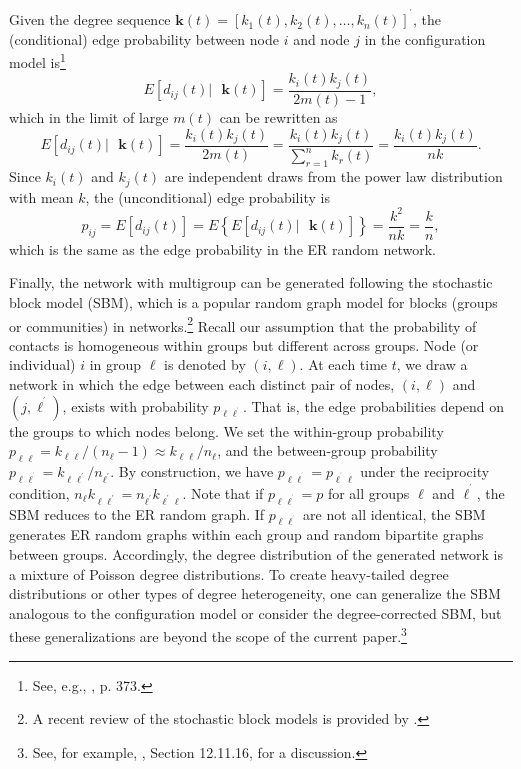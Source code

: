 \documentclass[12pt]{article}
\begin{document}
Given the degree sequence $\boldsymbol{k}\left(  t\right)  =\left[
k_{1}\left(  t\right)  ,k_{2}\left(  t\right)  ,\ldots,k_{n}\left(  t\right)
\right]  ^{^{\prime}}$, the (conditional) edge probability between node $i$
and node $j$ in the configuration model is\footnote{See, e.g.,
\cite{Newman2018book}, p. 373.}
\[
E\left[  d_{ij}\left(  t\right)  |\text{ }\boldsymbol{k}\left(  t\right)
\right]  =\frac{k_{i}\left(  t\right)  k_{j}\left(  t\right)  }{2m\left(
t\right)  -1},
\]
which in the limit of large $m\left(  t\right)  $ can be rewritten as%
\[
E\left[  d_{ij}\left(  t\right)  |\text{ }\boldsymbol{k}\left(  t\right)
\right]  =\frac{k_{i}\left(  t\right)  k_{j}\left(  t\right)  }{2m\left(
t\right)  }=\frac{k_{i}\left(  t\right)  k_{j}\left(  t\right)  }{\sum
_{r=1}^{n}k_{r}\left(  t\right)  }=\frac{k_{i}\left(  t\right)  k_{j}\left(
t\right)  }{nk}.
\]
Since $k_{i}\left(  t\right)  $ and $k_{j}\left(  t\right)  $ are independent
draws from the power law distribution with mean $k$, the (unconditional) edge
probability is%
\[
p_{ij}=E\left[  d_{ij}\left(  t\right)  \right]  =E\left\{  E\left[
d_{ij}\left(  t\right)  |\text{ }\boldsymbol{k}\left(  t\right)  \right]
\right\}  =\frac{k^{2}}{nk}=\frac{k}{n},
\]
which is the same as the edge probability in the ER random network.

Finally, the network with multigroup can be generated following the stochastic
block model (SBM), which is a popular random graph model for blocks (groups or
communities) in networks.\footnote{A recent review of the stochastic block
models is provided by \cite{LW2019reviewSBM}.} Recall our assumption that the
probability of contacts is homogeneous within groups but different across
groups. Node (or individual) $i$ in group $\ell$ is denoted by $\left(
i,\ell\right)  $. At each time $t$, we draw a network in which the edge
between each distinct pair of nodes, $\left(  i,\ell\right)  $ and $\left(
j,\ell^{^{\prime}}\right)  $, exists with probability $p_{\ell\ell^{^{\prime}%
}}.$ That is, the edge probabilities depend on the groups to which nodes
belong. We set the within-group probability $p_{\ell\ell}=k_{\ell\ell}/\left(
n_{\ell}-1\right)  \approx k_{\ell\ell}/n_{\ell}$, and the between-group
probability $p_{\ell\ell^{^{\prime}}}=k_{\ell\ell^{\prime}}/n_{\ell^{\prime}}%
$. By construction, we have $p_{\ell\ell^{^{\prime}}}=p_{\ell^{^{\prime}}\ell
}$ under the reciprocity condition, $n_{\ell}k_{\ell\ell^{\prime}}%
=n_{\ell^{\prime}}k_{\ell^{\prime}\ell}$. Note that if $p_{\ell\ell^{^{\prime
}}}=p$ for all groups $\ell$ and $\ell^{^{\prime}}$, the SBM reduces to the ER
random graph. If $p_{\ell\ell^{^{\prime}}}$ are not all identical, the SBM
generates ER random graphs within each group and random bipartite graphs
between groups. Accordingly, the degree distribution of the generated network
is a mixture of Poisson degree distributions. To create heavy-tailed degree
distributions or other types of degree heterogeneity, one can generalize the
SBM analogous to the configuration model or consider the degree-corrected SBM,
but these generalizations are beyond the scope of the current
paper.\footnote{See, for example, \cite{Newman2018book}, Section 12.11.16, for
a discussion.}
\end{document}
